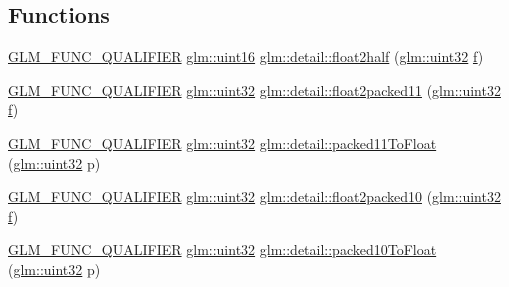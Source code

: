 \subsection*{Functions}
\begin{DoxyCompactItemize}
\item 
\mbox{\hyperlink{setup_8hpp_a33fdea6f91c5f834105f7415e2a64407}{G\+L\+M\+\_\+\+F\+U\+N\+C\+\_\+\+Q\+U\+A\+L\+I\+F\+I\+ER}} \mbox{\hyperlink{group__gtc__type__precision_gad8c2939e1fdd8e5828b31d95c52255d5}{glm\+::uint16}} \mbox{\hyperlink{namespaceglm_1_1detail_a35cfc58b7112bdadd2610cf9f1780255}{glm\+::detail\+::float2half}} (\mbox{\hyperlink{group__gtc__type__precision_ga202b6a53c105fcb7e531f9b443518451}{glm\+::uint32}} \mbox{\hyperlink{glad_8h_ae29c29480f1260cc37ad71203904ea4d}{f}})
\item 
\mbox{\hyperlink{setup_8hpp_a33fdea6f91c5f834105f7415e2a64407}{G\+L\+M\+\_\+\+F\+U\+N\+C\+\_\+\+Q\+U\+A\+L\+I\+F\+I\+ER}} \mbox{\hyperlink{group__gtc__type__precision_ga202b6a53c105fcb7e531f9b443518451}{glm\+::uint32}} \mbox{\hyperlink{namespaceglm_1_1detail_af3fe5d54f7627eb98c3493ee0a4b6fba}{glm\+::detail\+::float2packed11}} (\mbox{\hyperlink{group__gtc__type__precision_ga202b6a53c105fcb7e531f9b443518451}{glm\+::uint32}} \mbox{\hyperlink{glad_8h_ae29c29480f1260cc37ad71203904ea4d}{f}})
\item 
\mbox{\hyperlink{setup_8hpp_a33fdea6f91c5f834105f7415e2a64407}{G\+L\+M\+\_\+\+F\+U\+N\+C\+\_\+\+Q\+U\+A\+L\+I\+F\+I\+ER}} \mbox{\hyperlink{group__gtc__type__precision_ga202b6a53c105fcb7e531f9b443518451}{glm\+::uint32}} \mbox{\hyperlink{namespaceglm_1_1detail_a02d2bd65041cc9eb287030ae553051f0}{glm\+::detail\+::packed11\+To\+Float}} (\mbox{\hyperlink{group__gtc__type__precision_ga202b6a53c105fcb7e531f9b443518451}{glm\+::uint32}} p)
\item 
\mbox{\hyperlink{setup_8hpp_a33fdea6f91c5f834105f7415e2a64407}{G\+L\+M\+\_\+\+F\+U\+N\+C\+\_\+\+Q\+U\+A\+L\+I\+F\+I\+ER}} \mbox{\hyperlink{group__gtc__type__precision_ga202b6a53c105fcb7e531f9b443518451}{glm\+::uint32}} \mbox{\hyperlink{namespaceglm_1_1detail_a066e984b6ff1a54325e8d11afed5a0f9}{glm\+::detail\+::float2packed10}} (\mbox{\hyperlink{group__gtc__type__precision_ga202b6a53c105fcb7e531f9b443518451}{glm\+::uint32}} \mbox{\hyperlink{glad_8h_ae29c29480f1260cc37ad71203904ea4d}{f}})
\item 
\mbox{\hyperlink{setup_8hpp_a33fdea6f91c5f834105f7415e2a64407}{G\+L\+M\+\_\+\+F\+U\+N\+C\+\_\+\+Q\+U\+A\+L\+I\+F\+I\+ER}} \mbox{\hyperlink{group__gtc__type__precision_ga202b6a53c105fcb7e531f9b443518451}{glm\+::uint32}} \mbox{\hyperlink{namespaceglm_1_1detail_a4b6b6f9fdf91cf039dfb119f94686f8a}{glm\+::detail\+::packed10\+To\+Float}} (\mbox{\hyperlink{group__gtc__type__precision_ga202b6a53c105fcb7e531f9b443518451}{glm\+::uint32}} p)

\end{DoxyCompactItemize}
